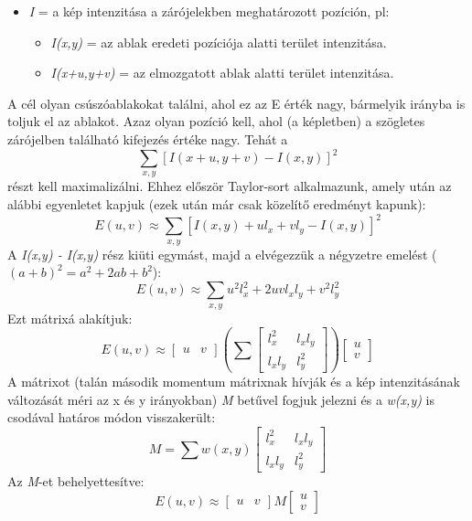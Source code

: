 \documentclass[12pt]{report}
\begin{document}
\begin{enumerate}
\begin{itemize}
                        \item \textit{I} = a kép intenzitása a zárójelekben meghatározott pozíción, pl:
                            \begin{itemize}
                                \item \textit{I(x,y)} = az ablak eredeti pozíciója alatti terület intenzitása.
                                \item \textit{I(x+u,y+v)} = az elmozgatott ablak alatti terület intenzitása.
                            \end{itemize}
                    \end{itemize}
                    A cél olyan csúszóablakokat találni, ahol ez az E érték nagy, bármelyik irányba is toljuk el az ablakot. Azaz olyan pozíció kell, ahol (a képletben) a szögletes zárójelben található kifejezés értéke nagy. Tehát a 
                    \[\sum_{x,y}[I(x+u,y+v) - I(x,y)]^2\]
                    részt kell maximalizálni. Ehhez először Taylor-sort alkalmazunk, amely után az alábbi egyenletet kapjuk (ezek után már csak közelítő eredményt kapunk):
                    \[E(u,v) \approx \sum_{x,y}[I(x,y) + ul_x + vl_y - I(x,y)]^2\]
                    A \textit{I(x,y) - I(x,y)} rész kiüti egymást, majd a elvégezzük a négyzetre emelést ($(a+b)^2 = a^2 + 2ab + b^2$):
                    \[E(u,v) \approx \sum_{x,y}u^2l_x^2 + 2uvl_xl_y + v^2l_y^2\]
                    Ezt mátrixá alakítjuk:
                    \[E(u,v) \approx \begin{bmatrix} u & v \end{bmatrix} (\sum \begin{bmatrix} l_x^2 & l_xl_y \\ l_xl_y & l_y^2 \end{bmatrix}) \begin{bmatrix} u \\ v \end{bmatrix}\]
                    A mátrixot (talán második momentum mátrixnak hívják és a kép intenzitásának változását méri az x és y irányokban) \textit{M} betűvel fogjuk jelezni és a \textit{w(x,y)} is csodával határos módon visszakerült:
                    \[M = \sum w(x,y)\begin{bmatrix} l_x^2 & l_xl_y \\ l_xl_y & l_y^2 \end{bmatrix}\]
                    Az \textit{M}-et behelyettesítve:
                    \[E(u,v) \approx \begin{bmatrix} u & v \end{bmatrix} M \begin{bmatrix} u \\ v \end{bmatrix}\]

\end{enumerate}
\end{document}
